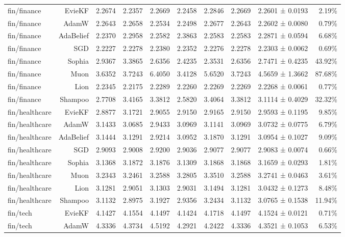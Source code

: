 \begin{table}[t]
\begin{tabular}{lrrrrrrrrr}
fin/finance & EvieKF & 2.2674 & 2.2357 & 2.2669 & 2.2458 & 2.2846 & 2.2669 & 2.2601 ± 0.0193 & 2.19\% \\
fin/finance & AdamW & 2.2643 & 2.2658 & 2.2534 & 2.2498 & 2.2677 & 2.2643 & 2.2602 ± 0.0080 & 0.79\% \\
fin/finance & AdaBelief & 2.2370 & 2.2958 & 2.2582 & 2.3863 & 2.2583 & 2.2583 & 2.2871 ± 0.0594 & 6.68\% \\
fin/finance & SGD & 2.2227 & 2.2278 & 2.2380 & 2.2352 & 2.2276 & 2.2278 & 2.2303 ± 0.0062 & 0.69\% \\
fin/finance & Sophia & 2.9367 & 3.3865 & 2.6356 & 2.4235 & 2.3531 & 2.6356 & 2.7471 ± 0.4235 & 43.92\% \\
fin/finance & Muon & 3.6352 & 3.7243 & 6.4050 & 3.4128 & 5.6520 & 3.7243 & 4.5659 ± 1.3662 & 87.68\% \\
fin/finance & Lion & 2.2345 & 2.2175 & 2.2289 & 2.2260 & 2.2269 & 2.2269 & 2.2268 ± 0.0061 & 0.77\% \\
fin/finance & Shampoo & 2.7708 & 3.4165 & 3.3812 & 2.5820 & 3.4064 & 3.3812 & 3.1114 ± 0.4029 & 32.32\% \\
fin/healthcare & EvieKF & 2.8877 & 3.1721 & 2.9055 & 2.9150 & 2.9165 & 2.9150 & 2.9593 ± 0.1195 & 9.85\% \\
fin/healthcare & AdamW & 3.1433 & 3.0685 & 2.9433 & 3.0969 & 3.1141 & 3.0969 & 3.0732 ± 0.0775 & 6.79\% \\
fin/healthcare & AdaBelief & 3.1444 & 3.1291 & 2.9214 & 3.0952 & 3.1870 & 3.1291 & 3.0954 ± 0.1027 & 9.09\% \\
fin/healthcare & SGD & 2.9093 & 2.9008 & 2.9200 & 2.9036 & 2.9077 & 2.9077 & 2.9083 ± 0.0074 & 0.66\% \\
fin/healthcare & Sophia & 3.1368 & 3.1872 & 3.1876 & 3.1309 & 3.1868 & 3.1868 & 3.1659 ± 0.0293 & 1.81\% \\
fin/healthcare & Muon & 3.2343 & 3.2461 & 3.2588 & 3.2805 & 3.3510 & 3.2588 & 3.2741 ± 0.0463 & 3.61\% \\
fin/healthcare & Lion & 3.1281 & 2.9051 & 3.1303 & 2.9031 & 3.1494 & 3.1281 & 3.0432 ± 0.1273 & 8.48\% \\
fin/healthcare & Shampoo & 3.1132 & 2.8975 & 3.1927 & 2.9356 & 3.2434 & 3.1132 & 3.0765 ± 0.1538 & 11.94\% \\
fin/tech & EvieKF & 4.1427 & 4.1554 & 4.1497 & 4.1424 & 4.1718 & 4.1497 & 4.1524 ± 0.0121 & 0.71\% \\
fin/tech & AdamW & 4.3336 & 4.3734 & 4.5192 & 4.2921 & 4.2422 & 4.3336 & 4.3521 ± 0.1053 & 6.53\% \\

\end{tabular}
\end{table}
